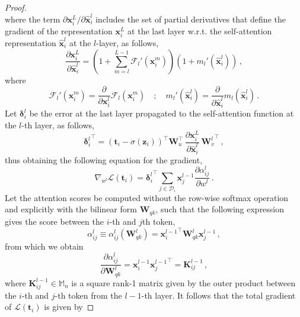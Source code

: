 \begin{proof}
\begin{equation}
\end{equation}
%
where the term $\partial \bm{x}_i^L / \partial \hat{\bm{x}}_i^l$ includes the set of partial derivatives that define the gradient of the representation $\bm{x}_i^L $ at the last layer w.r.t. the self-attention representation $\hat{\bm{x}}_i^l$ at the $l$-layer, as follows,
%
\begin{equation}
    \frac{\partial \bm{x}_i^L}{\partial \hat{\bm{x}}_i^l} = \left(1 + \sum_{m = l}^{L-1}\mathcal{F}_l'(\bm{x}_i^m)\right) \left(1 + m_l'(\hat{\bm{x}}^l_i)\right)\,,
\end{equation}
%
where 
%
\begin{equation}
    \mathcal{F}_l'(\bm{x}_i^m) = \frac{\partial}{\partial \bm{x}_i^l}\mathcal{F}_l(\bm{x}_i^m) \quad ; \quad m_l'(\hat{\bm{x}}^l_i) = \frac{\partial}{\partial \bm{\hat{x}}_i^l} m_l(\hat{\bm{x}}^l_i) \,.
\end{equation}
%
Let $\bm{\delta}^l_i$ be the error at the last layer propagated to the self-attention function at the $l$-th layer, as follows, 
%
\begin{equation}
    {\bm{\delta}^l_i}^\top = (\bm{t}_i - \sigma(\bm{z}_i))^\top \bm{W}_u^\top \, \frac{\partial \bm{x}^L_i}{\partial \hat{\bm{x}}^l_i} \,
     {\bm{W}^l_v}^\top \,,
\end{equation}
%
thus obtaining the following equation for the gradient,
%
\begin{equation}
     \nabla_{w^l} \mathcal{L}(\bm{t}_i) = {\bm{\delta}^l_i}^\top  \sum_{j\in \mathcal{D}_i} \bm{x}^{l-1}_j  \frac{\partial \alpha^l_{ij}}{\partial w^l} \,.
\end{equation}
%
Let the attention scores be computed without the row-wise softmax operation and explicitly with the bilinear form $\bm{W}_{qk}$, such that the following expression gives the score between the $i$-th and $j$th token,
%
\begin{equation}
    \alpha^l_{ij} \equiv \alpha^l_{ij}(\bm{W}_{qk}^l) = {\bm{x}^{l-1}_i}^\top \bm{W}_{qk}^l \bm{x}^{l-1}_j \,,
\end{equation}
%
from which we obtain
%
\begin{equation}
    \frac{\partial \alpha^l_{ij}}{\partial \bm{W}_{qk}^l} = \bm{x}^{l-1}_i{\bm{x}^{l-1}_j}^\top = \bm{K}^{l-1}_{ij}\, ,
\end{equation}
%
where $\bm{K}^{l-1}_{ij} \in \mathbb{M}_n$ is a square rank-1 matrix given by the outer product between the $i$-th and $j$-th token from the $l-1$-th layer.
%
It follows that the total gradient of $\mathcal{L}(\bm{t}_i)$ is given by

\end{proof}
